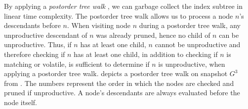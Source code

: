 \documentclass[abstracton,12pt]{scrartcl}
\theoremstyle{definition}
\begin{document}
By applying a
\textit{postorder tree walk} \cite{Cormen-postorder}, we can garbage collect the
index subtree in linear time complexity. The postorder tree walk allows us to
process a node $n$'s descendants before $n$. 
When visiting node $n$ during a postorder tree walk, any unproductive descendant
of $n$ was already pruned, hence no child of $n$ can be unproductive. Thus, if $n$
has at least one child, $n$ cannot be unproductive and therefore checking if $n$
has at least one child, in addition to checking if $n$ is matching or volatile,
is sufficient to determine if $n$ is unproductive, when applying a postorder
tree walk.
 depicts a postorder tree walk on snapshot $G^3$ from
. The numbers represent the
order in which the nodes are checked and pruned if unproductive. A node's
descendants are always evaluated before the node itself.
\end{document}
